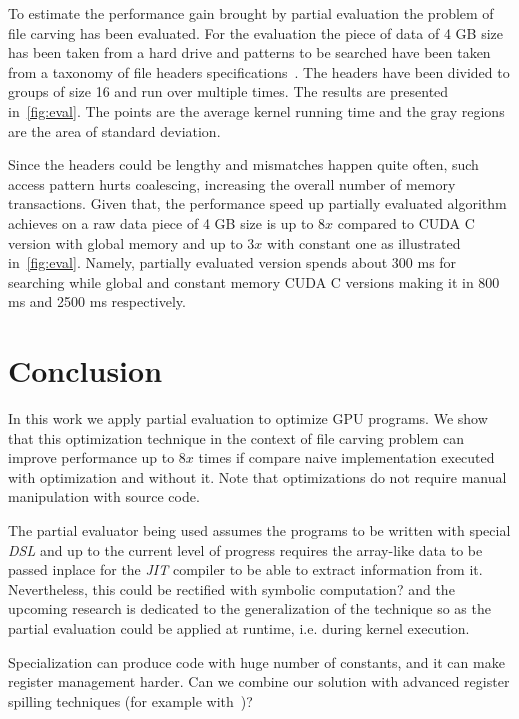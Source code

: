 \documentclass[sigplan,review,anonymous]{acmart}\settopmatter{printfolios=true,printccs=false,printacmref=false}
\newcommand\todo[1]{{\color{red}#1}}
\begin{document}
To estimate the performance gain brought by partial evaluation the problem of file carving has been evaluated.
For the evaluation the piece of data of 4 GB size has been taken from a hard drive and patterns to be searched have been taken from a taxonomy of file headers specifications~\cite{Headers}.
The headers have been divided to groups of size 16 and run over multiple times.
The results are presented in~\ref{fig:eval}.
The points are the average kernel running time and the gray regions are the area of standard deviation.   

Since the headers could be lengthy and mismatches happen quite often, such access pattern hurts coalescing, increasing the overall number of memory transactions. 
Given that, the performance speed up partially evaluated algorithm achieves on a raw data piece of 4 GB size is up to $8x$ compared to CUDA C version with global memory and up to $3x$ with constant one as illustrated in~\ref{fig:eval}. Namely, partially evaluated version spends about 300 ms for searching while global and constant memory CUDA C versions making it in 800 ms and 2500 ms respectively.  



\section{Conclusion}
In this work we apply partial evaluation to optimize GPU programs.
We show that this optimization technique in the context of file carving problem can improve performance up to $8x$ times if compare naive implementation executed with optimization and without it.
Note that optimizations do not require manual manipulation with source code.
    
The partial evaluator being used assumes the programs to be written with special \textit{DSL} and up to the current level of progress requires the array-like data to be passed \todo{inplace} for the \textit{JIT} compiler to be able to extract information from it. Nevertheless, this could be \todo{rectified} with \todo{symbolic computation?} and the upcoming research is dedicated to the generalization of the technique so as the partial evaluation could be applied at runtime, i.e. during kernel execution.

Specialization can produce code with huge number of constants, and it can make register management harder. 
Can we combine our solution with advanced register spilling techniques (for example with~\cite{Sakdhnagool2019RegDemIG})?
\end{document}
